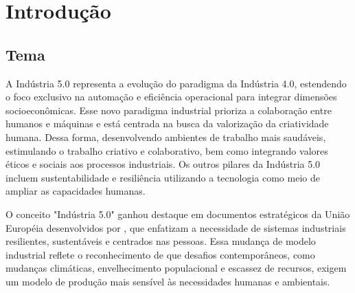 

\chapter{Introdução}\label{cap:introducao}


\section{Tema}


A Indústria 5.0 representa a evolução do paradigma da Indústria 4.0, estendendo o foco exclusivo na automação e eficiência operacional para integrar dimensões socioeconômicas.
Esse novo paradigma industrial prioriza a colaboração entre humanos e máquinas e está centrada na busca da valorização da criatividade humana.
Dessa forma, desenvolvendo ambientes de trabalho mais saudáveis, estimulando o trabalho criativo e colaborativo, bem como integrando valores éticos e sociais aos processos industriais.
Os outros pilares da Indústria 5.0 incluem sustentabilidade e resiliência utilizando a tecnologia como meio de ampliar as capacidades humanas.

O conceito "Indústria 5.0" ganhou destaque em documentos estratégicos da União Européia desenvolvidos por , que enfatizam a necessidade de sistemas industriais resilientes, sustentáveis e centrados nas pessoas.
Essa mudança de modelo industrial reflete o reconhecimento de que desafios contemporâneos, como mudanças climáticas, envelhecimento populacional e escassez de recursos, exigem um modelo de produção mais sensível às necessidades humanas e ambientais.

